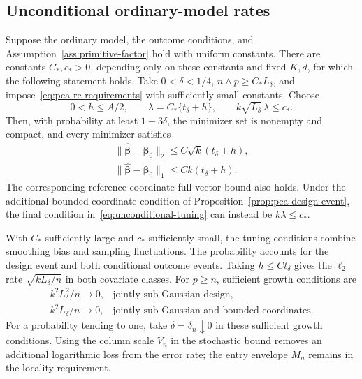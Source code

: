 \subsection{Unconditional ordinary-model rates}
\label{subsec:unconditional-rates}
\begin{theorem}
\label{thm:unconditional-ordinary}
Suppose the ordinary model, the outcome conditions, and Assumption~\ref{ass:primitive-factor} hold with uniform constants. There are constants $C_*,c_*>0$, depending only on these constants and fixed $K,d$, for which the following statement holds. Take $0<\delta<1/4$, $n\wedge p\ge C_*L_\delta$, and impose~\eqref{eq:pca-re-requirements} with sufficiently small constants. Choose
\begin{equation}
 0<h\le A/2,\qquad
 \lambda=C_*\{t_\delta+h\},\qquad
 k\sqrt{L_\delta}\,\lambda\le c_*.
 \label{eq:unconditional-tuning}
\end{equation}
Then, with probability at least $1-3\delta$, the minimizer set is nonempty and compact, and every minimizer satisfies
\begin{equation}
 \begin{gathered}
\|\widehat{\bm{\beta}}-\bm{\beta}_0\|_2\le C\sqrt{k}(t_\delta+h),\\
 \|\widehat{\bm{\beta}}-\bm{\beta}_0\|_1\le Ck(t_\delta+h).
 \end{gathered}
 \label{eq:unconditional-rates}
\end{equation}
The corresponding reference-coordinate full-vector bound also holds. Under the additional bounded-coordinate condition of Proposition~\ref{prop:pca-design-event}, the final condition in~\eqref{eq:unconditional-tuning} can instead be $k\lambda\le c_*$.
\end{theorem}
With $C_*$ sufficiently large and $c_*$ sufficiently small, the tuning conditions combine smoothing bias and sampling fluctuations. The probability accounts for the design event and both conditional outcome events. Taking $h\le Ct_\delta$ gives the $\ell_2$ rate $\sqrt{kL_\delta/n}$ in both covariate classes. For $p\ge n$, sufficient growth conditions are
\begin{equation}
 \begin{array}{ll}
 k^2L_\delta^2/n\longrightarrow0,
    &\text{jointly sub-Gaussian design},\\[2pt]
 k^2L_\delta/n\longrightarrow0,
    &\text{jointly sub-Gaussian and bounded coordinates}.
 \end{array}
 \label{eq:growth-specialization}
\end{equation}
For a probability tending to one, take $\delta=\delta_n\downarrow0$ in these sufficient growth conditions. Using the column scale $V_n$ in the stochastic bound removes an additional logarithmic loss from the error rate; the entry envelope $M_n$ remains in the locality requirement.

